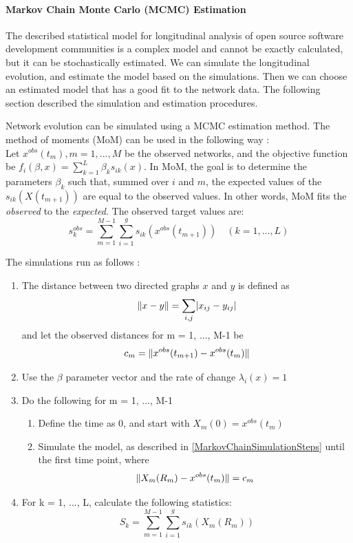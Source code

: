 \documentclass[12pt]{report}
\DeclarePairedDelimiter{\abs}{\lvert}{\rvert}
\DeclarePairedDelimiter{\norm}{\lVert}{\rVert}
\begin{document}
\paragraph*{Markov Chain Monte Carlo (MCMC) Estimation}
\label{estimation}
The described statistical model for longitudinal analysis of open source software development communities is a complex model and cannot be exactly calculated, but it can be stochastically estimated. We can simulate the longitudinal evolution, and estimate the model based on the simulations. Then we can choose an estimated model that has a good fit to the network data.
The following section described the simulation and estimation procedures. 

Network evolution can be simulated using a MCMC estimation method. The method of moments (MoM) can be used in the following way \cite{Snijders2004}: \\

Let $x^{obs}(t_m), m = 1, ..., M$ be the observed networks, and the objective function be $f_i(\beta, x) = \sum_{k=1}^L \beta_k s_{ik}(x)$. 
In MoM, the goal is to determine the parameters $\beta_k$ such that, summed over $i$ and $m$, the expected values of the $s_{ik}(X(t_{m+1}))$ are equal to the observed values. In other words, MoM fits the \textit{observed} to the \textit{expected}. 
The observed target values are:
\begin{equation}
s_k^{obs} = \sum_{m=1}^{M-1}\sum_{i=1}^g s_{ik}(x^{obs}(t_{m+1})) \quad (k = 1, ..., L)
\end{equation}

The simulations run as follows \cite{Snijders2004}:
\begin{enumerate}
\item The distance between two directed graphs $x$ and $y$ is defined as
\begin{equation}
\norm{x -y} = \sum_{i,j}\abs{x_{ij} - y_{ij}}
\end{equation}
and let the observed distances for m = 1, ..., M-1 be 
\begin{equation}
c_m = \norm{x^{obs}(t_{m+1})-x^{obs}(t_m)}
\end{equation}
\item Use the $\beta$ parameter vector and the rate of change $\lambda_{i}(x) = 1$

\item Do the following for m = 1, ..., M-1
\begin{enumerate}
\item Define the time as 0, and start with $X_m(0) = x^{obs}(t_m)$
\item Simulate the model, as described in \ref{MarkovChainSimulationSteps} until the first time point, where 
\begin{equation}
\norm{X_m(R_m) - x^{obs}(t_m)} = c_m
\end{equation}
\end{enumerate}
\item For k = 1, ..., L, calculate the following statistics:
\begin{equation}
S_k = \sum_{m = 1}^{M-1}\sum_{i=1}^{g}s_{ik}(X_m(R_m))
\end{equation}
\end{enumerate}
\end{document}
